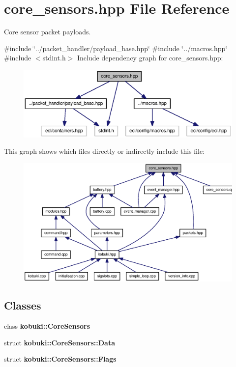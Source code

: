 \section{core\-\_\-sensors.\-hpp \-File \-Reference}
\label{core__sensors_8hpp}


\-Core sensor packet payloads.  


{\ttfamily \#include \char`\"{}../packet\-\_\-handler/payload\-\_\-base.\-hpp\char`\"{}}\*
{\ttfamily \#include \char`\"{}../macros.\-hpp\char`\"{}}\*
{\ttfamily \#include $<$stdint.\-h$>$}\*
\-Include dependency graph for core\-\_\-sensors.\-hpp\-:
\nopagebreak
\begin{figure}[H]
\begin{center}
\leavevmode
\includegraphics[width=350pt]{core__sensors_8hpp__incl}
\end{center}
\end{figure}
\-This graph shows which files directly or indirectly include this file\-:
\nopagebreak
\begin{figure}[H]
\begin{center}
\leavevmode
\includegraphics[width=350pt]{core__sensors_8hpp__dep__incl}
\end{center}
\end{figure}
\subsection*{\-Classes}
\begin{DoxyCompactItemize}
\item 
class {\bf kobuki\-::\-Core\-Sensors}
\item 
struct {\bf kobuki\-::\-Core\-Sensors\-::\-Data}
\item 
struct {\bf kobuki\-::\-Core\-Sensors\-::\-Flags}
\end{DoxyCompactItemize}

